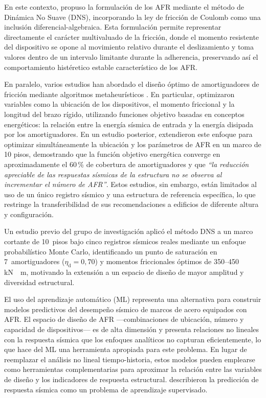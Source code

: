 \documentclass[preprint,12pt,authoryear]{elsarticle}
\newcommand{\etad}{\eta_{\mathrm{d}}}
\newcommand{\KM}{\,\si{kN{\cdot}m}}
\begin{document}
En este contexto, \citet{Namorado2024} propuso la formulación de los AFR
mediante el método de Dinámica No Suave (DNS), incorporando la ley de fricción
de Coulomb como una inclusión diferencial-algebraica. Esta formulación permite
representar directamente el carácter multivaluado de la fricción, donde el
momento resistente del dispositivo se opone al movimiento relativo durante el
deslizamiento y toma valores dentro de un intervalo limitante durante la
adherencia, preservando así el comportamiento histéretico estable característico
de los AFR.

En paralelo, varios estudios han abordado el diseño óptimo de amortiguadores
de fricción mediante algoritmos metaheurísticos
\citep{moreschi_design_2003, moghaddam_optimal_2022, miguel_simultaneous_2016,
ontiveros-perez_reliability-based_2019}. En particular, \citet{Jarrahi2020jbe} optimizaron
variables como la ubicación de los dispositivos, el momento friccional y la
longitud del brazo rígido, utilizando funciones objetivo basadas en conceptos
energéticos: la relación entre la energía sísmica de entrada y la energía
disipada por los amortiguadores. En un estudio posterior, \citet{Jarrahi2020sdee}
extendieron este enfoque para optimizar simultáneamente la ubicación y los
parámetros de AFR en un marco de 10 pisos, demostrando que la función objetivo
energética converge en aproximadamente el 60\,\% de cobertura de amortiguadores
y que \textit{``la reducción apreciable de las respuestas sísmicas de la
estructura no se observa al incrementar el número de AFR''}. Estos estudios,
sin embargo, están limitados al uso de un único registro sísmico y una estructura
de referencia específica, lo que restringe la transferibilidad de sus
recomendaciones a edificios de diferente altura y configuración.

Un estudio previo del grupo de investigación \citep{Ponce2026} aplicó el método
DNS a un marco cortante de 10~pisos bajo cinco registros sísmicos reales
mediante un enfoque probabilístico Monte Carlo, identificando un punto de
saturación en 7~amortiguadores ($\etad = 0{,}70$) y momentos friccionales
óptimos de 350--450\KM, motivando la extensión a un espacio de diseño de mayor
amplitud y diversidad estructural.

El uso del aprendizaje automático (ML) representa una alternativa para construir
modelos predictivos del desempeño sísmico de marcos de acero equipados con AFR.
El espacio de diseño de AFR ---combinaciones de ubicación, número y capacidad
de dispositivos--- es de alta dimensión y presenta relaciones no lineales con
la respuesta sísmica que los enfoques analíticos no capturan eficientemente,
lo que hace del ML una herramienta apropiada para este problema. En lugar de
reemplazar el análisis no lineal tiempo-historia, estos modelos pueden emplearse
como herramientas complementarias para aproximar la relación entre las variables
de diseño y los indicadores de respuesta estructural. \citet{Kazemi2022}
describieron la predicción de respuesta sísmica como un problema de aprendizaje
supervisado.
\end{document}
